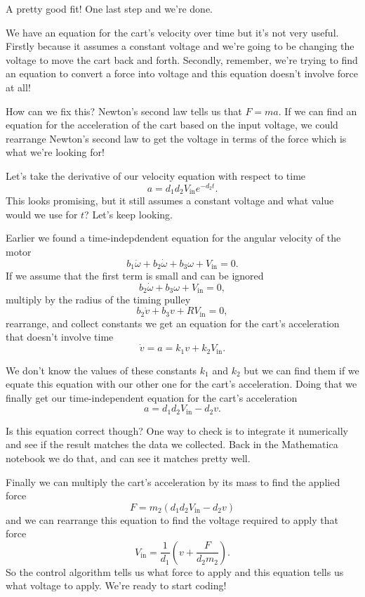 \documentclass{article}
\begin{document}
A pretty good fit! One last step and we're done.

We have an equation for the cart's velocity over time but it's not very useful. Firstly because it assumes a constant voltage and we're going to be changing the voltage to move the cart back and forth. Secondly, remember, we're trying to find an equation to convert a force into voltage and this equation doesn't involve force at all!

How can we fix this? Newton's second law tells us that $F = m a$. If we can find an equation for the acceleration of the cart based on the input voltage, we could rearrange Newton's second law to get the voltage in terms of the force which is what we're looking for!

Let's take the derivative of our velocity equation with respect to time \[a = d_1 d_2 V_\text{in} e^{-d_2 t}.\] This looks promising, but it still assumes a constant voltage and what value would we use for $t$? Let's keep looking.

Earlier we found a time-indepdendent equation for the angular velocity of the motor \[b_1 \ddot{\omega} + b_2 \dot{\omega} + b_3 \omega + V_\text{in} = 0.\] If we assume that the first term is small and can be ignored \[b_2 \dot{\omega} + b_3 \omega + V_\text{in} = 0,\] multiply by the radius of the timing pulley \[b_2 \dot{v} + b_3 v + R V_\text{in} = 0,\] rearrange, and collect constants we get an equation for the cart's acceleration that doesn't involve time \[\dot{v} = a = k_1 v + k_2 V_\text{in}.\]

We don't know the values of these constants $k_1$ and $k_2$ but we can find them if we equate this equation with our other one for the cart's acceleration. Doing that we finally get our time-independent equation for the cart's acceleration \[a = d_1 d_2 V_\text{in} - d_2 v.\]

Is this equation correct though? One way to check is to integrate it numerically and see if the result matches the data we collected. Back in the Mathematica notebook we do that, and can see it matches pretty well.

Finally we can multiply the cart's acceleration by its mass to find the applied force \[F = m_2 (d_1 d_2 V_\text{in} - d_2 v)\] and we can rearrange this equation to find the voltage required to apply that force \[V_\text{in} = \frac{1}{d_1} \left( v + \frac{F}{d_2 m_2} \right).\] So the control algorithm tells us what force to apply and this equation tells us what voltage to apply. We're ready to start coding!
\end{document}
